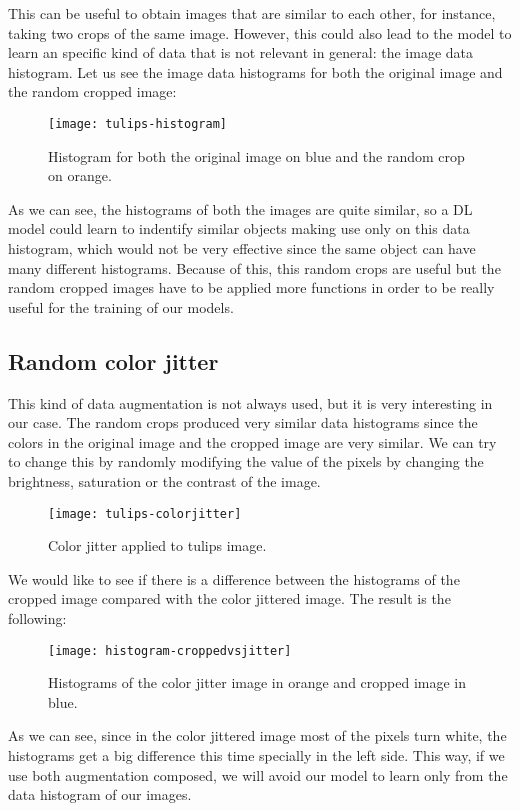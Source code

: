 This can be useful to obtain images that are similar to each other, for instance, taking two crops of the same image. However, this could also lead to the model to learn an specific kind of data that is not relevant in general: the image data histogram. Let us see the image data histograms for both the original image and the random cropped image:

\begin{figure}[htp] 
    \centering
    \texttt{[image: tulips-histogram]}%
        \label{fig:hist:orig:cropped}%
        \caption{Histogram for both the original image on blue and the random crop on orange.}
\end{figure}

As we can see, the histograms of both the images are quite similar, so a DL model could learn to indentify similar objects making use only on this data histogram, which would not be very effective since the same object can have many different histograms. Because of this, this random crops are useful but the random cropped images have to be applied more functions in order to be really useful for the training of our models. 


\subsection*{Random color jitter}

This kind of data augmentation is not always used, but it is very interesting in our case. The random crops produced very similar data histograms since the colors in the original image and the cropped image are very similar. We can try to change this by randomly modifying the value of the pixels by changing the brightness, saturation or the contrast of the image.

\begin{figure}[htp] 
    \centering
    \texttt{[image: tulips-colorjitter]}%
        \label{fig:color:jitter}%
        \caption{Color jitter applied to tulips image.}
\end{figure}

We would like to see if there is a difference between the histograms of the cropped image compared with the color jittered image. The result is the following:

\begin{figure}[htp] 
    \centering
    \texttt{[image: histogram-croppedvsjitter]}%
        \label{fig:color:jitter}%
        \caption{Histograms of the color jitter image in orange and cropped image in blue.}
\end{figure}

As we can see, since in the color jittered image most of the pixels turn white, the histograms get a big difference this time specially in the left side. This way, if we use both augmentation composed, we will avoid our model to learn only from the data histogram of our images.

